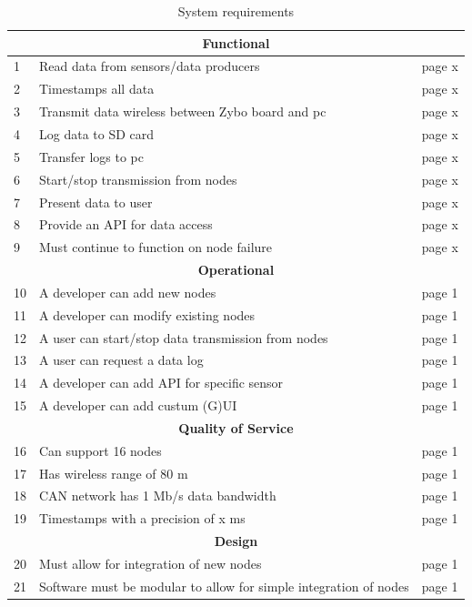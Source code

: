 \begin{table}[]
\centering
\caption{System requirements}
\label{tab:requirements}
\begin{tabular}{ |p{0.3cm}|p{8.5cm}|p{1cm}| }
\hline
\multicolumn{3}{|c|}{\textbf{Functional}}\\
\hline
1 & Read data from sensors/data producers 				& page x \\
2 & Timestamps all data 								& page x \\
3 & Transmit data wireless between Zybo board and pc 	& page x \\
4 & Log data to SD card 								& page x \\
5 & Transfer logs to pc 								& page x \\
6 & Start/stop transmission from nodes 					& page x \\
7 & Present data to user								& page x \\
8 & Provide an API for data access						& page x \\
9 & Must continue to function on node failure			& page x \\

\hline
\multicolumn{3}{|c|}{\textbf{Operational}}\\
\hline	
10 & A developer can add new nodes 						& page 1 \\
11 & A developer can modify existing nodes 				& page 1 \\
12 & A user can start/stop data transmission from nodes	& page 1 \\
13 & A user can request a data log 						& page 1 \\
14 & A developer can add API for specific sensor 		& page 1 \\
15 & A developer can add custum (G)UI					& page 1 \\


\hline
\multicolumn{3}{|c|}{\textbf{Quality of Service}}\\
\hline	
16 & Can support 16 nodes							 	& page 1 \\
17 & Has wireless range of 80 m						 	& page 1 \\
18 & CAN network has 1 Mb/s data bandwidth			 	& page 1 \\
19 & Timestamps with a precision of x ms 			 	& page 1 \\

\hline
\multicolumn{3}{|c|}{\textbf{Design}}\\
\hline	
20 & Must allow for integration of new nodes		 					& page 1 \\
21 & Software must be modular to allow for simple integration of nodes	& page 1 \\

\hline
\end{tabular}

\end{table}

